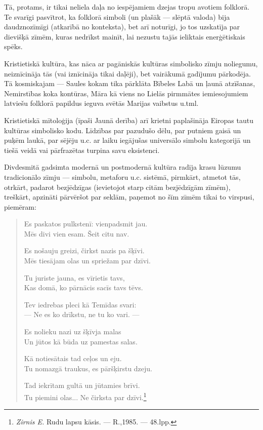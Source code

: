 \documentclass[11pt]{article}
\begin{document}
Tā, protams, ir tikai neliela daļa no iespējamiem dzejas
tropu avotiem folklorā. Te svarīgi pasvītrot, ka folklorā
simboli (un plašāk --- slēptā valoda) bija daudznozīmīgi
(atkarībā no konteksta), bet arī noturīgi, jo tos uzskatīja
par dievišķā zīmēm, kuras nedrīkst mainīt, lai nezustu
tajās ieliktais enerģētiskais spēks.

Kristietiskā kultūra, kas nāca ar pagāniskās kultūras
simbolisko zīmju noliegumu, neiznīcināja tās
(vai iznīcināja tikai daļēji), bet vairākumā gadījumu
pārkodēja. Tā kosmiskajam --- Saules kokam tika
pārklāta Bībeles Labā un ļaunā atzīšanas, Nemirstības
koka kontūras, Māra kā viens no Lielās pirmmātes
iemiesojumiem latviešu folklorā papildus ieguva
svētās Marijas vaibstus u.tml.

Kristietiskā mītoloģija (īpaši Jaunā derība) arī krietni
paplašināja Eiropas tautu kultūras simbolisko kodu.
Līdzības par pazudušo dēlu, par putniem gaisā un puķēm
laukā, par sējēju u.c. ar laiku iegājušas universālo
simbolu kategorijā un tiešā veidā vai pārfrazētas turpina
savu eksistenci.

Divdesmitā gadsimta modernā un postmodernā kultūra radīja
krasu lūzumu tradicionālo zīmju --- simbolu, metaforu
u.c. sistēmā, pirmkārt, atmetot tās, otrkārt, padarot
bezjēdzīgas (ievietojot starp citām bezjēdzīgām zīmēm),
treškārt, apzināti pārvēršot par seklām, paņemot no šīm
zīmēm tikai to virspusi, piemēram:

\begin{quote}
Es paskatos pulkstenī: vienpadsmit jau.\\
Mēs divi vien esam. Šeit citu nav.

Es nošauju greizi, čirkst nazis pa šķīvi.\\
Mēs tiesājam olas un spriežam par dzīvi.

Tu juriste jauna, es vīrietis tavs,\\
Kas domā, ko pārnācis sacīs tavs tēvs.

Tev iedrebas pleci kā Temīdas svari:\\
--- Ne es ko drīkstu, ne tu ko vari. ---

Es nolieku nazi uz šķīvja malas\\
Un jūtos kā būda uz pamestas salas.

Kā notiesātais tad ceļos un eju.\\
Tu nomazgā traukus, es pāršķirstu dzeju.

Tad iekrītam gultā un jūtamies brīvi.\\
Tu piemini olas... Ne čirksta par dzīvi.\footnote{{\em Zirnis
E.} Rudu lapsu kāsis. --- R.,1985. --- 48.lpp.}
\end{quote}
\end{document}
